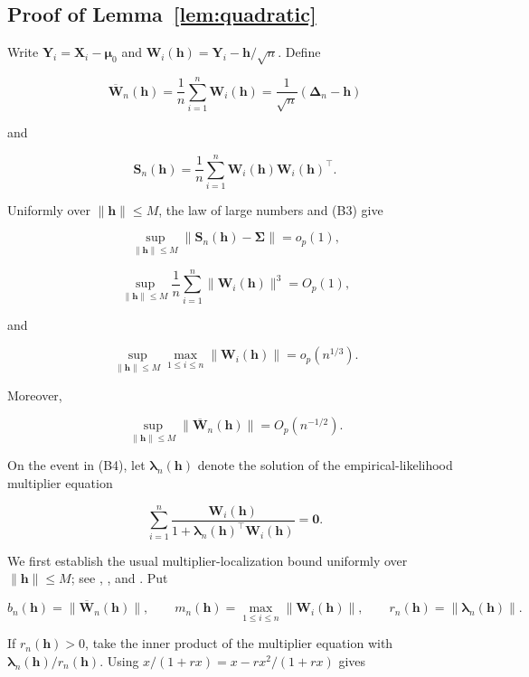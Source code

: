 \documentclass[11pt]{article}
\theoremstyle{remark}
\begin{document}
\subsection{Proof of Lemma~\ref{lem:quadratic}}

Write $\boldsymbol{Y}_i=\boldsymbol{X}_i-\boldsymbol{\mu}_0$ and $\boldsymbol{W}_i(\boldsymbol{h})=\boldsymbol{Y}_i-\boldsymbol{h}/\sqrt{n}$. Define

$$ \overline{\boldsymbol{W}}_n(\boldsymbol{h})=\frac{1}{n}\sum_{i=1}^n\boldsymbol{W}_i(\boldsymbol{h})=\frac{1}{\sqrt{n}}(\boldsymbol{\Delta}_n-\boldsymbol{h}) $$

and

$$ \boldsymbol{S}_n(\boldsymbol{h})=\frac{1}{n}\sum_{i=1}^n\boldsymbol{W}_i(\boldsymbol{h})\boldsymbol{W}_i(\boldsymbol{h})^\top. $$

Uniformly over $\|\boldsymbol{h}\|\leq M$, the law of large numbers and (B3) give

$$ \sup_{\|\boldsymbol{h}\|\leq M}\|\boldsymbol{S}_n(\boldsymbol{h})-\boldsymbol{\Sigma}\|=o_p(1), $$

$$ \sup_{\|\boldsymbol{h}\|\leq M}\frac{1}{n}\sum_{i=1}^n\|\boldsymbol{W}_i(\boldsymbol{h})\|^3=O_p(1), $$

and

$$ \sup_{\|\boldsymbol{h}\|\leq M}\max_{1\leq i\leq n}\|\boldsymbol{W}_i(\boldsymbol{h})\|=o_p(n^{1/3}). $$

Moreover,

$$ \sup_{\|\boldsymbol{h}\|\leq M}\|\overline{\boldsymbol{W}}_n(\boldsymbol{h})\|=O_p(n^{-1/2}). $$

On the event in (B4), let $\boldsymbol{\lambda}_n(\boldsymbol{h})$ denote the solution of the empirical-likelihood multiplier equation

$$ \sum_{i=1}^n\frac{\boldsymbol{W}_i(\boldsymbol{h})}{1+\boldsymbol{\lambda}_n(\boldsymbol{h})^\top\boldsymbol{W}_i(\boldsymbol{h})}=\boldsymbol{0}. $$

We first establish the usual multiplier-localization bound uniformly over $\|\boldsymbol{h}\|\leq M$; see \citet{owen1990}, \citet{qinlawless1994}, and \citet{owen2001}. Put

$$ b_n(\boldsymbol{h})=\|\overline{\boldsymbol{W}}_n(\boldsymbol{h})\|,\qquad m_n(\boldsymbol{h})=\max_{1\leq i\leq n}\|\boldsymbol{W}_i(\boldsymbol{h})\|,\qquad r_n(\boldsymbol{h})=\|\boldsymbol{\lambda}_n(\boldsymbol{h})\|. $$

If $r_n(\boldsymbol{h})>0$, take the inner product of the multiplier equation with $\boldsymbol{\lambda}_n(\boldsymbol{h})/r_n(\boldsymbol{h})$. Using $x/(1+rx)=x-rx^2/(1+rx)$ gives
\end{document}

